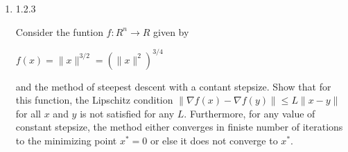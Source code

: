 \documentclass[11pt,letterpaper]{article}
\begin{document}
\begin{enumerate}
	Norms:

	\[ \|x^{k+1} \| = 
	|1 - s(2 + \alpha) \|x^k\|^{\alpha} | \|x^k\| \]

	To converge to 0 the norm must decrease (say to less than 1):

	\[ |1 - s(2 + \alpha) \|x^k\|^{\alpha} | < 1 \]

	\[ -1 < 1 - s(2 + \alpha) \|x^k\|^{\alpha} < 1 \]

	\[s(2 + \alpha) \|x^k\|^{\alpha} < 2\]

	Case 1: $\alpha = 0$

	\[f(x) = \|x\|^2 \]

	\[ x_{k+1} = (1 - 2s)x^k \]

	\[ x_{k} = (1 - 2s)^k x_0 \]

	Converges to 0 if:

	\[ |1 - 2s| < 1 \ when \ 0 < s < 1 \]

	So if $\alpha = 0$ then $0 < s < 1$

	Case 2: $\alpha > 0$

	\[r_k = \|x_k\|\]

	\[r_{k+1} = 
	|1 - s(2 + \alpha)r_k^{\alpha}|r_k \]

	Found earlier:

	\[s(2 + \alpha) \|x^k\|^{\alpha} < 2\]

	\[ s < \frac{2}{(2 + \alpha) \|x_0\|^{\alpha}} \]

	\[ |1 - s(2 + \alpha) r_0^{\alpha} | < 1 \]

	\[ 0 \geq r_{k+1} < r_k \]

	Threfore $r$ converges to zero so $x$ converges to zero

	For $\alpha = 0$ the gradient is:

	\[ \nabla f(x) = 2x \]

	This is globally Lipschits with $L = 2$

	For $\alpha > 0$ the Hessian grows without bound as
	$\|x\| \rightarrow \inf$ making it not globally
	Lipschitz. Therefore Prop 1.2.3 does not gurantee global
	convergence with constant step size for all intial points.

	\item 1.2.3

	Consider the funtion $f:R^n \rightarrow R$ given by

	$f(x) = \|x\|^{3/2} = (\|x\|^2)^{3/4}$

	and the method of steepest descent with a contant stepsize.
	Show that for this function, the Lipschitz condition
	$\| \nabla f(x) - \nabla f(y) \| \leq L \| x - y \|$
	for all $x$ and $y$ is not satisfied for any $L$.
	Furthermore, for any value of constant stepsize,
	the method either converges in finiste number of iterations
	to the minimizing point $x^* = 0$ or else it does not converge
	to $x^*$.


\end{enumerate}
\end{document}
